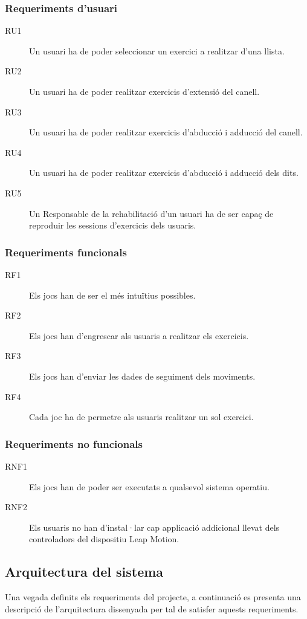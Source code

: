 \documentclass[12pt,a4paper,catalan]{article}
\begin{document}
	\subsubsection*{Requeriments d'usuari}
	\begin{description}
		\item [RU1] Un usuari ha de poder seleccionar un exercici a realitzar d’una llista.
		\item [RU2] Un usuari ha de poder realitzar exercicis d’extensió del canell.
		\item [RU3] Un usuari ha de poder realitzar exercicis d’abducció i adducció del canell.
		\item [RU4] Un usuari ha de poder realitzar exercicis d’abducció i adducció dels dits.
		\item [RU5] Un Responsable de la rehabilitació d’un usuari ha de ser capaç de reproduir les sessions d’exercicis dels usuaris.
	\end{description}
	\subsubsection*{Requeriments funcionals}
	\begin{description}
		\item [RF1] Els jocs han de ser el més intuïtius possibles.
		\item [RF2] Els jocs han d'engrescar als usuaris a realitzar els exercicis.
		\item [RF3] Els jocs han d’enviar les dades de seguiment dels moviments.
		\item [RF4] Cada joc ha de permetre als usuaris realitzar un sol exercici.
	\end{description}
	\subsubsection*{Requeriments no funcionals}
	\begin{description}
		\item [RNF1] Els jocs han de poder ser executats a qualsevol sistema operatiu.
		\item [RNF2] Els usuaris no han d'instal·lar cap applicació addicional llevat dels controladors del dispositiu Leap Motion.
	\end{description}
	\subsection{Arquitectura del sistema}
	Una vegada definits els requeriments del projecte, a continuació es presenta una descripció de l’arquitectura dissenyada per tal de satisfer aquests requeriments.
	
\end{document}
